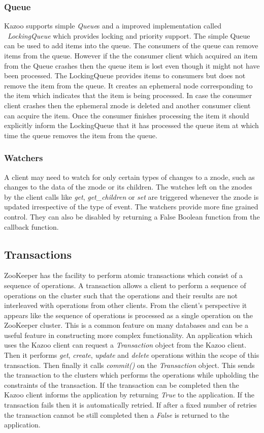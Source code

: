   \subsubsection{Queue}
    Kazoo supports simple \textit{Queue}s and a improved implementation called ~\textit{LockingQueue} which provides locking and priority support. The simple Queue can be used to add items into the queue. The consumers of the queue can remove items from the queue. However if the the consumer client which acquired an item from the Queue crashes then the queue item is lost even though it might not have been processed. The LockingQueue provides items to consumers but does not remove the item from the queue. It creates an ephemeral node corresponding to the item which indicates that the item is being processed. In case the consumer client crashes then the ephemeral znode is deleted and another consumer client can acquire the item. Once the consumer finishes processing the item it should explicitly inform the LockingQueue that it has processed the queue item at which time the queue removes the item from the queue.
  
  \subsubsection{Watchers}
  A client may need to watch for only certain types of changes to a znode, such as changes to the data of the znode or its children. The watches left on the znodes by the client calls like \textit{get}, \textit{get\_children} or \textit{set} are triggered whenever the znode is updated irrespective of the type of event. The watchers provide more fine grained control. They can also be disabled by returning a False Boolean function from the callback function.
  
  \subsection{Transactions}
  ZooKeeper has the facility to perform atomic transactions which consist of a sequence of operations. A transaction allows a client to perform a sequence of operations on the cluster such that the operations and their results are not interleaved with operations from other clients. From the client's perspective it appears like the sequence of operations is processed as a single operation on the ZooKeeper cluster. This is a common feature on many databases and can be a useful feature in constructing more complex functionality. An application which uses the Kazoo client can request a \textit{Transaction} object from the Kazoo client. Then it performs \textit{get}, \textit{create}, \textit{update} and \textit{delete} operations within the scope of this transaction. Then finally it calls \textit{commit()} on the \textit{Transaction} object. This sends the transaction to the clusters which performs the operations while upholding the constraints of the transaction. If the transaction can be completed then the Kazoo client informs the application by returning \textit{True} to the application. If the transaction fails then it is automatically retried. If after a fixed number of retries the transaction cannot be still completed then a \textit{False} is returned to the application.
